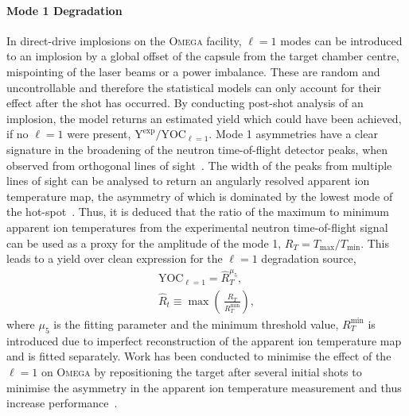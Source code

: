 \paragraph*{Mode 1 Degradation}
In direct-drive implosions on the \textsc{Omega} facility, $\ell=1$ modes can be introduced to an implosion by a global offset of the capsule from the target chamber centre, mispointing of the laser beams or a power imbalance.
These are random and uncontrollable and therefore the statistical models can only account for their effect after the shot has occurred.
By conducting post-shot analysis of an implosion, the model returns an estimated yield which could have been achieved, if no $\ell=1$ were present, $\text{Y}^{\text{exp}}/\text{YOC}_{\ell=1}$.
Mode 1 asymmetries have a clear signature in the broadening of the neutron time-of-flight detector peaks, when observed from orthogonal lines of sight~\cite{mannion_mitigation_2021}.
The width of the peaks from multiple lines of sight can be analysed to return an angularly resolved apparent ion temperature map, the asymmetry of which is dominated by the lowest mode of the hot-spot~\cite{woo_inferring_2020}.
Thus, it is deduced that the ratio of the maximum to minimum apparent ion temperatures from the experimental neutron time-of-flight signal can be used as a proxy for the amplitude of the mode 1, $R_T = T_{\text{max}}/T_{\text{min}}$.
This leads to a yield over clean expression for the $\ell=1$ degradation source,
\begin{equation}
    \begin{gathered}
        \text{YOC}_{\ell=1} = \hat{R}_T^{\mu_5}, \\
        \hat{R}_t \equiv \max \left( \, \frac{R_T}{R_T^{\text{min}}} \right),
    \end{gathered}
\end{equation}
where $\mu_5$ is the fitting parameter and the minimum threshold value, $R_T^{\text{min}}$ is introduced due to imperfect reconstruction of the apparent ion temperature map and is fitted separately.
Work has been conducted to minimise the effect of the $\ell=1$ on \textsc{Omega} by repositioning the target after several initial shots to minimise the asymmetry in the apparent ion temperature measurement and thus increase performance~\cite{mannion_mitigation_2021}.

